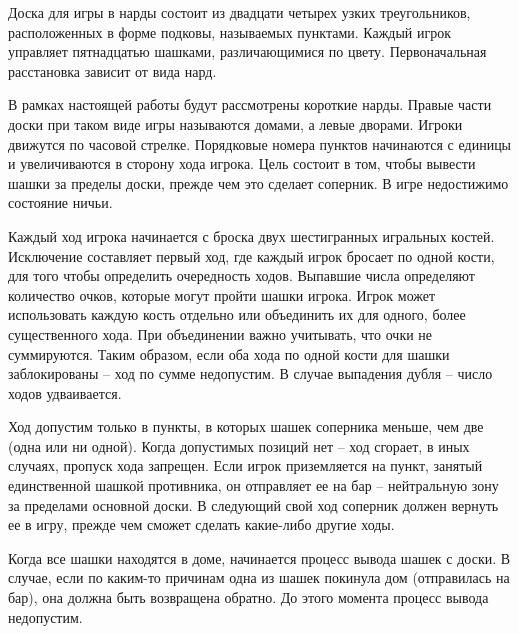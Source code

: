 Доска для игры в нарды состоит из двадцати четырех узких треугольников, расположенных в форме подковы, называемых пунктами. Каждый игрок управляет пятнадцатью шашками, различающимися по цвету. Первоначальная расстановка зависит от вида нард.

В рамках настоящей работы будут рассмотрены короткие нарды. Правые части доски при таком виде игры называются домами, а левые дворами. Игроки движутся по часовой стрелке. Порядковые номера пунктов начинаются с единицы и увеличиваются в сторону хода игрока. Цель состоит в том, чтобы вывести шашки за пределы доски, прежде чем это сделает соперник. В игре недостижимо состояние ничьи.

Каждый ход игрока начинается с броска двух шестигранных игральных костей. Исключение составляет первый ход, где каждый игрок бросает по одной кости, для того чтобы определить очередность ходов. Выпавшие числа определяют количество очков, которые могут пройти шашки игрока. Игрок может использовать каждую кость отдельно или объединить их для одного, более существенного хода. При объединении важно учитывать, что очки не суммируются. Таким образом, если оба хода по одной кости для шашки заблокированы -- ход по сумме недопустим. В случае выпадения дубля -- число ходов удваивается.

Ход допустим только в пункты, в которых шашек соперника меньше, чем две (одна или ни одной).  Когда допустимых позиций нет -- ход сгорает, в иных случаях, пропуск хода запрещен. Если игрок приземляется на пункт, занятый единственной шашкой противника, он отправляет ее на бар -- нейтральную зону за пределами основной доски. В следующий свой ход соперник должен вернуть ее в игру, прежде чем сможет сделать какие-либо другие ходы.

Когда все шашки находятся в доме, начинается процесс вывода шашек с доски. В случае, если по каким-то причинам одна из шашек покинула дом (отправилась на бар), она должна быть возвращена обратно. До этого момента процесс вывода недопустим.
